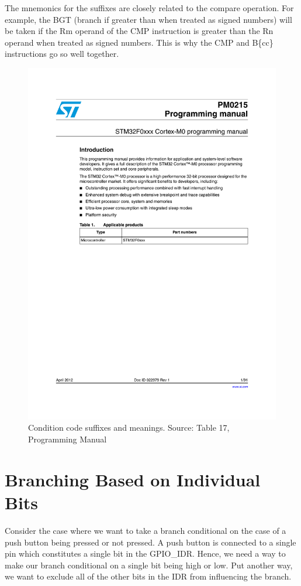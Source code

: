 The mnemonics for the suffixes are closely related to the compare operation. For example, the BGT (branch if greater than when treated as signed numbers) will be taken if the Rm operand of the CMP instruction is greater than the Rn operand when treated as signed numbers. This is why the CMP and B\{cc\}  instructions go so well together.

\begin{figure}
\centering
\includegraphics[page=40, clip=true, trim=110 130 60 434, width=\textwidth]{./stm32f0xx_programming_manual}
\caption{Condition code suffixes and meanings. Source: Table 17, Programming Manual}
\label{fig:cc_suff}
\end{figure}

\section{Branching Based on Individual Bits}
Consider the case where we want to take a branch conditional on the case of a push button being pressed or not pressed. A push button is connected to a single pin which constitutes a single bit in the GPIO\_IDR. Hence, we need a way to make our branch conditional on a single bit being high or low. Put another way, we want to exclude all of the other bits in the IDR from influencing the branch. 

